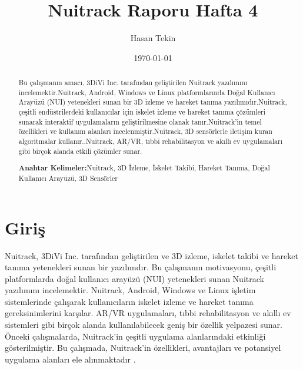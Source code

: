 \documentclass[12pt, a4paper]{article}
\begin{document}
	\newpage
		\title{Nuitrack Raporu Hafta 4}
	\author{Hasan Tekin}
	\date{\today}
	\maketitle
	
	\title{}
	\author{}
	\date{}
	\maketitle
		\setcounter{section}{0}
		\begin{abstract}
		\begin{justify}
		Bu çalışmanın amacı, 3DiVi Inc. tarafından geliştirilen Nuitrack yazılımını incelemektir.Nuitrack, Android, Windows ve Linux platformlarında Doğal Kullanıcı Arayüzü (NUI) yetenekleri sunan bir 3D izleme ve hareket tanıma yazılımıdır.Nuitrack, çeşitli endüstrilerdeki kullanıcılar için iskelet izleme ve hareket tanıma çözümleri sunarak interaktif uygulamaların geliştirilmesine olanak tanır.Nuitrack'in temel özellikleri ve kullanım alanları incelenmiştir.Nuitrack, 3D sensörlerle iletişim kuran algoritmalar kullanır..Nuitrack, AR/VR, tıbbi rehabilitasyon ve akıllı ev uygulamaları gibi birçok alanda etkili çözümler sunar.  
		\end{justify}
		\textbf{Anahtar Kelimeler:}Nuitrack, 3D İzleme, İskelet Takibi, Hareket Tanıma, Doğal Kullanıcı Arayüzü, 3D Sensörler
		
	\end{abstract}
	\section{Giriş}

	Nuitrack, 3DiVi Inc. tarafından geliştirilen ve 3D izleme, iskelet takibi ve hareket tanıma yetenekleri sunan bir yazılımdır. Bu çalışmanın motivasyonu, çeşitli platformlarda doğal kullanıcı arayüzü (NUI) yetenekleri sunan Nuitrack yazılımını incelemektir. Nuitrack, Android, Windows ve Linux işletim sistemlerinde çalışarak kullanıcıların iskelet izleme ve hareket tanıma gereksinimlerini karşılar. AR/VR uygulamaları, tıbbi rehabilitasyon ve akıllı ev sistemleri gibi birçok alanda kullanılabilecek geniş bir özellik yelpazesi sunar. Önceki çalışmalarda, Nuitrack'in çeşitli uygulama alanlarındaki etkinliği gösterilmiştir. Bu çalışmada, Nuitrack'in özellikleri, avantajları ve potansiyel uygulama alanları ele alınmaktadır \cite{3DiVi}.

	\newpage
	
\end{document}
